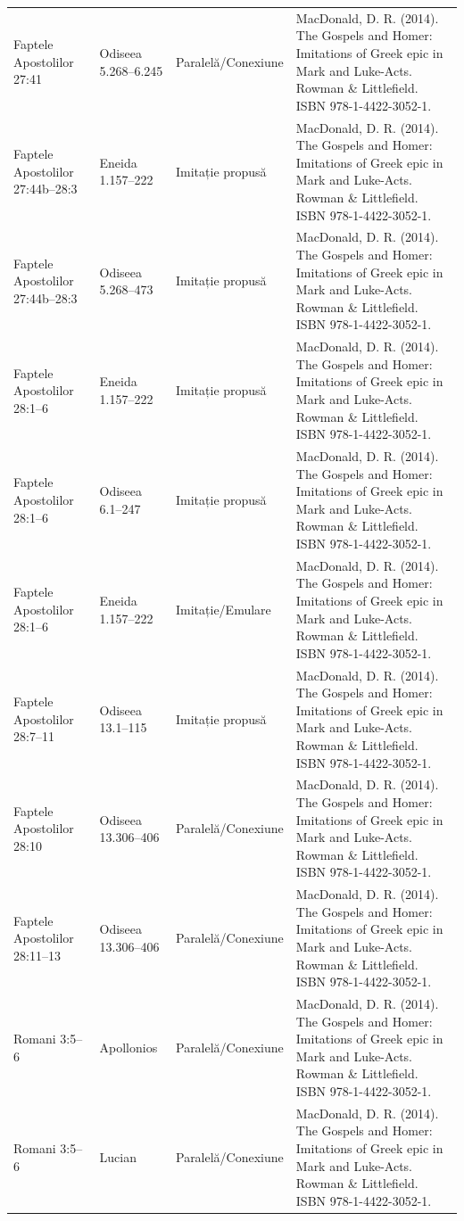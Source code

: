\documentclass[12pt,a4paper,twoside,openany]{book}
\begin{document}
\begin{longtable}{L{1.4cm}L{1.7cm}L{3.1cm}L{8.4cm}}
Faptele Apostolilor 27:41 & Odiseea 5.268–6.245 & Paralelă/Conexiune & MacDonald, D. R. (2014). The Gospels and Homer: Imitations of Greek epic in Mark and Luke-Acts. Rowman \& Littlefield. ISBN 978-1-4422-3052-1. \\
Faptele Apostolilor 27:44b–28:3 & Eneida 1.157–222 & Imitație propusă & MacDonald, D. R. (2014). The Gospels and Homer: Imitations of Greek epic in Mark and Luke-Acts. Rowman \& Littlefield. ISBN 978-1-4422-3052-1. \\
Faptele Apostolilor 27:44b–28:3 & Odiseea 5.268–473 & Imitație propusă & MacDonald, D. R. (2014). The Gospels and Homer: Imitations of Greek epic in Mark and Luke-Acts. Rowman \& Littlefield. ISBN 978-1-4422-3052-1. \\
Faptele Apostolilor 28:1–6 & Eneida 1.157–222 & Imitație propusă & MacDonald, D. R. (2014). The Gospels and Homer: Imitations of Greek epic in Mark and Luke-Acts. Rowman \& Littlefield. ISBN 978-1-4422-3052-1. \\
Faptele Apostolilor 28:1–6 & Odiseea 6.1–247 & Imitație propusă & MacDonald, D. R. (2014). The Gospels and Homer: Imitations of Greek epic in Mark and Luke-Acts. Rowman \& Littlefield. ISBN 978-1-4422-3052-1. \\
Faptele Apostolilor 28:1–6 & Eneida 1.157–222 & Imitație/Emulare & MacDonald, D. R. (2014). The Gospels and Homer: Imitations of Greek epic in Mark and Luke-Acts. Rowman \& Littlefield. ISBN 978-1-4422-3052-1. \\
Faptele Apostolilor 28:7–11 & Odiseea 13.1–115 & Imitație propusă & MacDonald, D. R. (2014). The Gospels and Homer: Imitations of Greek epic in Mark and Luke-Acts. Rowman \& Littlefield. ISBN 978-1-4422-3052-1. \\
Faptele Apostolilor 28:10 & Odiseea 13.306–406 & Paralelă/Conexiune & MacDonald, D. R. (2014). The Gospels and Homer: Imitations of Greek epic in Mark and Luke-Acts. Rowman \& Littlefield. ISBN 978-1-4422-3052-1. \\
Faptele Apostolilor 28:11–13 & Odiseea 13.306–406 & Paralelă/Conexiune & MacDonald, D. R. (2014). The Gospels and Homer: Imitations of Greek epic in Mark and Luke-Acts. Rowman \& Littlefield. ISBN 978-1-4422-3052-1. \\
Romani 3:5–6 & Apollonios & Paralelă/Conexiune & MacDonald, D. R. (2014). The Gospels and Homer: Imitations of Greek epic in Mark and Luke-Acts. Rowman \& Littlefield. ISBN 978-1-4422-3052-1. \\
Romani 3:5–6 & Lucian & Paralelă/Conexiune & MacDonald, D. R. (2014). The Gospels and Homer: Imitations of Greek epic in Mark and Luke-Acts. Rowman \& Littlefield. ISBN 978-1-4422-3052-1. \\

\end{longtable}
\end{document}
